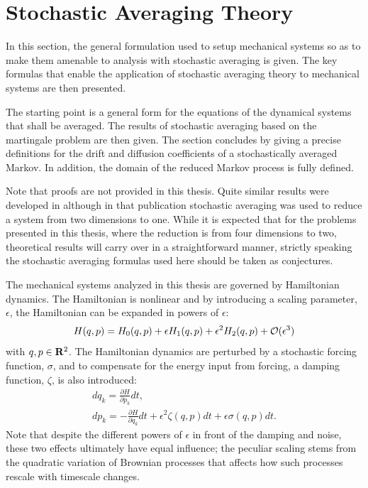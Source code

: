 
\section{Stochastic Averaging Theory}
\label{s:stochatic averaging theory}

In this section, the general formulation used to setup mechanical systems so as to make them amenable to analysis with stochastic averaging is given. The key formulas that enable the application of stochastic averaging theory to mechanical systems are then presented.

The starting point is a general form for the equations of the dynamical systems that shall be averaged. The results of stochastic averaging based on the martingale problem are then given. The section concludes by giving a precise definitions for the drift and diffusion coefficients of a stochastically averaged Markov. In addition, the domain of the reduced Markov process is fully defined.

Note that proofs are not provided in this thesis. Quite similar results were developed in \citet{namachchivaya01:_unified_approac_noisy_nonlin_mathieu_type_system} although in that publication stochastic averaging was used to reduce a system from two dimensions to one. While it is expected that for the problems presented in this thesis, where the reduction is from four dimensions to two, theoretical results will carry over in a straightforward manner, strictly speaking the stochastic averaging formulas used here should be taken as conjectures.

The mechanical systems analyzed in this thesis are governed by Hamiltonian dynamics. The Hamiltonian is nonlinear and by introducing a scaling parameter, $\epsilon$, the Hamiltonian can be expanded in powers of $\epsilon$:
\begin{equation}
\label{e:hamiltonian}
H(q,p) = H_0(q,p) + \epsilon H_1(q,p) + \epsilon^2 H_2(q,p) + \mathcal{O}(\epsilon^3)
\end{equation}
with $q,p \in \mathbf R^2$. The Hamiltonian dynamics are perturbed by a stochastic forcing function, $\sigma$, and to compensate for the energy input from forcing, a damping function, $\zeta$, is also introduced:
\begin{gather*}
dq_k = \frac{\partial H}{\partial p_k} dt,\\
dp_k = -\frac{\partial H}{\partial q_k} dt + \epsilon^2 \zeta(q,p) dt + \epsilon \sigma(q,p) dt.
\end{gather*}
Note that despite the different powers of $\epsilon$ in front of the damping and noise, these two effects ultimately have equal influence; the peculiar scaling stems from the quadratic variation of Brownian processes that affects how such processes rescale with timescale changes.

